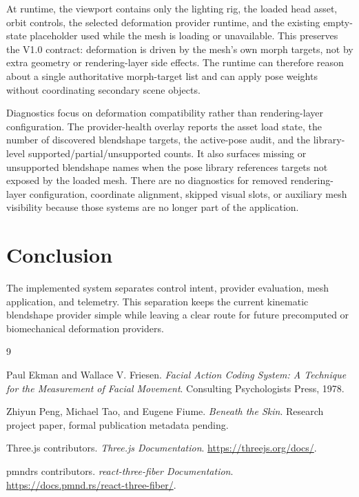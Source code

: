 \documentclass[11pt]{article}
\begin{document}
At runtime, the viewport contains only the lighting rig, the loaded head asset, orbit controls, the selected deformation provider runtime, and the existing empty-state placeholder used while the mesh is loading or unavailable.  This preserves the V1.0 contract: deformation is driven by the mesh's own morph targets, not by extra geometry or rendering-layer side effects.  The runtime can therefore reason about a single authoritative morph-target list and can apply pose weights without coordinating secondary scene objects.

Diagnostics focus on deformation compatibility rather than rendering-layer configuration.  The provider-health overlay reports the asset load state, the number of discovered blendshape targets, the active-pose audit, and the library-level supported/partial/unsupported counts.  It also surfaces missing or unsupported blendshape names when the pose library references targets not exposed by the loaded mesh.  There are no diagnostics for removed rendering-layer configuration, coordinate alignment, skipped visual slots, or auxiliary mesh visibility because those systems are no longer part of the application.

\section{Conclusion}

The implemented system separates control intent, provider evaluation, mesh application, and telemetry.  This separation keeps the current kinematic blendshape provider simple while leaving a clear route for future precomputed or biomechanical deformation providers.

\begin{thebibliography}{9}

Paul Ekman and Wallace V. Friesen.
\newblock \emph{Facial Action Coding System: A Technique for the Measurement of Facial Movement}.
\newblock Consulting Psychologists Press, 1978.

Zhiyun Peng, Michael Tao, and Eugene Fiume.
\newblock \emph{Beneath the Skin}.
\newblock Research project paper, formal publication metadata pending.

Three.js contributors.
\newblock \emph{Three.js Documentation}.
\newblock \url{https://threejs.org/docs/}.

pmndrs contributors.
\newblock \emph{react-three-fiber Documentation}.
\newblock \url{https://docs.pmnd.rs/react-three-fiber/}.

\end{thebibliography}
\end{document}

